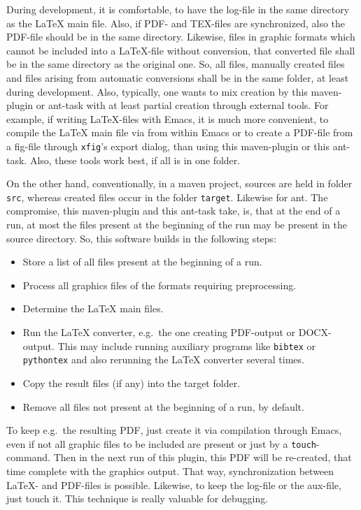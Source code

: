 During development, it is comfortable, 
to have the log-file in the same directory as the \LaTeX{} main file. 
Also, if PDF- and TEX-files are synchronized, 
also the PDF-file should be in the same directory. 
Likewise, files in graphic formats 
which cannot be included into a \LaTeX-file without conversion, 
that converted file shall be in the same directory as the original one. 
So, all files, manually created files 
and files arising from automatic conversions 
shall be in the same folder, at least during development. 
Also, typically, one wants to mix creation by this maven-plugin or ant-task 
with at least partial creation through external tools. 
For example, if writing \LaTeX-files with Emacs, 
it is much more convenient, to compile the \LaTeX{} main file 
via \pdflatex{} from within Emacs 
or to create a PDF-file from a \gls{fig}-file 
through \texttt{xfig}'s export dialog, 
than using this maven-plugin or this ant-task. 
Also, these tools work best, if all is in one folder. 

On the other hand, 
conventionally, in a maven project, 
sources are held in folder \texttt{src}, 
whereas created files occur in the folder \texttt{target}. 
Likewise for ant. 
The compromise, this maven-plugin and this ant-task take, 
is, that at the end of a run, 
at most the files present at the beginning of the run 
may be present in the source directory. 
So, this software builds in the following steps: 
%
\begin{itemize}
\item
Store a list of all files present at the beginning of a run.
\item
Process all graphics files of the formats requiring preprocessing.
\item
Determine the \LaTeX{} main files.
\item
Run the \LaTeX{} converter, e.g.~the one creating PDF-output or DOCX-output.
This may include running auxiliary programs like \texttt{bibtex} or \texttt{pythontex} 
and also rerunning the \LaTeX{} converter several times. 
\item
Copy the result files (if any) into the target folder.
\item
Remove all files not present at the beginning of a run, by default. 
\end{itemize}

To keep e.g.~the resulting PDF, 
just create it via compilation through Emacs, 
even if not all graphic files to be included are present 
or just by a \texttt{touch}-command. 
Then in the next run of this plugin, 
this PDF will be re-created, 
that time complete with the graphics output. 
That way, synchronization between \LaTeX- and PDF-files is possible. 
Likewise, to keep the log-file or the aux-file, just touch it. 
This technique is really valuable for debugging. 

